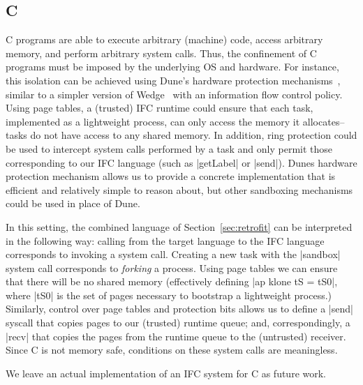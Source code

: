 \subsection{C}
\label{sec:real:c}
%
C programs are able to execute arbitrary (machine) code, access
arbitrary memory, and perform arbitrary system calls.
%
Thus, the confinement of C programs must be imposed by the underlying OS
and hardware.
%
For instance, this isolation can be achieved using Dune's hardware protection
mechanisms~\cite{Belay:2012:DSU:2387880.2387913}, similar to a simpler
version of Wedge~\cite{Belay:2012:DSU:2387880.2387913,
Bittau:2008:WSA:1387589.1387611} with an information flow control
policy.
%
Using page tables, a (trusted) IFC runtime could ensure that each task,
implemented as a lightweight process, can only access the memory it
allocates--tasks do not have access to any shared memory.
%
In addition, ring protection could be used to intercept system
calls performed by
a task and only permit those corresponding to our IFC language (such as
|getLabel| or |send|).
%
Dunes hardware protection mechanism allows us to provide a concrete
implementation that is efficient and relatively simple to reason
about, but other sandboxing mechanisms could be used in place of Dune.

In this setting, the combined language of Section~\ref{sec:retrofit}
can be interpreted in the following way: calling from the target
language to the IFC language corresponds to invoking a system call.
%
Creating a new task with the |sandbox| system call corresponds to
\emph{forking} a process.  Using page tables we can ensure that
there will be no shared memory
(effectively
defining |ap klone tS
= tS0|, where |tS0| is the set of pages necessary to bootstrap a
lightweight process.)
%
Similarly, control over page tables and protection bits allows us to
define a |send| syscall that copies pages to our
(trusted) runtime queue; and, correspondingly, a |recv| that copies
the pages from the runtime queue to the (untrusted) receiver.
%
Since C is not memory safe, conditions on these system calls are
meaningless.

We leave an actual implementation of an IFC system for C as
future work.
